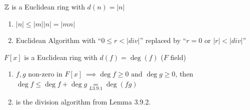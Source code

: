 \begin{example}
    ${\mathbb{Z}}$ is a Euclidean ring with $d(n)=|n|$
    \begin{enumerate}
        \item $|n|\leq |m||n|=|mn| $
        \item Euclidean Algorithm with ``$0\leq r < |div|$'' replaced by ``$r=0$ or $|r|< |div|$''
    \end{enumerate}
\end{example}
\begin{example}
    $F[x]$ is a Euclidean ring with $d(f) = \deg (f)$ ($F$ field)
    \begin{enumerate}
        \item $f,g$ non-zero in $F[x] \ \implies \deg f \geq 0 \text{ and }\deg g\geq 0$, then
        $\deg f \leq \deg f + \deg g \underset{L3.9.1}{=} \deg(fg)$
        \item is the division algorithm from Lemma 3.9.2.
    \end{enumerate}
\end{example}
\newpage
